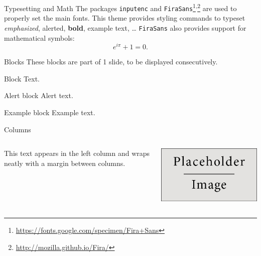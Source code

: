 \documentclass{beamer}
\begin{document}

\begin{frame}{Typesetting and Math}
	The packages \texttt{inputenc} and \texttt{FiraSans}\footnote{\url{https://fonts.google.com/specimen/Fira+Sans}}\textsuperscript{,}\footnote{\url{http://mozilla.github.io/Fira/}} are used to properly set the main fonts.
	\vfill
	This theme provides styling commands to typeset \emph{emphasized}, \alert{alerted}, \textbf{bold}, \textcolor{example}{example text}, \dots
	\vfill
	\texttt{FiraSans} also provides support for mathematical symbols:
	\begin{equation*}
		e^{i\pi} + 1 = 0.
	\end{equation*}
\end{frame}




\begin{frame}{Blocks}
	These blocks are part of 1 slide, to be displayed consecutively.
	\begin{block}{Block}
		Text.
	\end{block}
	\pause %
	\begin{alertblock}{Alert block}
		Alert \alert{text}.
	\end{alertblock}
	\pause %
	\begin{exampleblock}{Example block}
		Example \textcolor{example}{text}.
	\end{exampleblock}
\end{frame}


\begin{frame}{Columns}
	\begin{columns}
			This text appears in the left column and wraps neatly with a margin between columns.
		
			\includegraphics[width=\linewidth]{Images/placeholder.jpg}
	\end{columns}
\end{frame}
\end{document}
